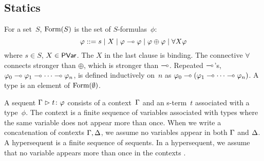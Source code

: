 \documentclass[envcountsame]{llncs}
\begin{document}


\subsection{Statics}
For a set~$S$,
$\mathop{\text{Form}}(S)$ is the set of $S$-formulas~$\phi$:
\[
\varphi::= s \mid X \mid \varphi\multimap\varphi\mid \varphi\oplus\varphi\mid
\forall X \varphi
\]
where $s\in S$, $X\in \mathsf{PVar}$. The $X$ in the
last clause is binding.
The connective $\forall$ connects stronger than $\oplus$, which is
stronger than $\multimap$.
Repeated $\multimap$'s,
$\varphi_0\multimap\varphi_1\multimap\cdots\multimap\varphi_n$, is defined inductively on~$n$
as
$\varphi_0\multimap(\varphi_1\multimap\cdots\multimap\varphi_n)$.
A type is an element of $\mathop{\text{Form}}(\emptyset)$.

A sequent ${\Gamma}\vartriangleright{ {t} \colon{\varphi} }$ consists of a
context~$\Gamma$ and an s-term~$t$ associated with a type~$\phi$.
The context is a finite sequence of variables associated
with types where the same variable does not appear more than once.
When we write a concatenation of contexts $\Gamma,\Delta$, we assume no variables
appear in both $\Gamma$ and $\Delta$.
A hypersequent is a finite sequence of sequents.
In a hypersequent, we assume that no variable appears more than once in
the contexts%
.
\end{document}

